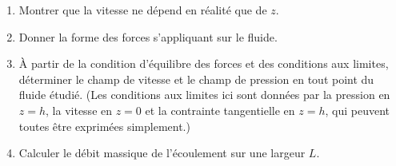 \begin{enumerate}
\item Montrer que la vitesse ne dépend en réalité que de $z$.
	
\item Donner la forme des forces s’appliquant sur le fluide.
	
\item À partir de la condition d’équilibre des forces et des
conditions aux limites, déterminer le champ de vitesse et le champ
de pression en tout point du fluide étudié.
(Les conditions aux limites ici sont données par la pression en $z=h$,
la vitesse en $z=0$ et la contrainte tangentielle en $z=h$, qui peuvent
toutes être exprimées simplement.)
	
\item Calculer le débit massique de l’écoulement sur une largeur
$L$.
	
\end{enumerate}

